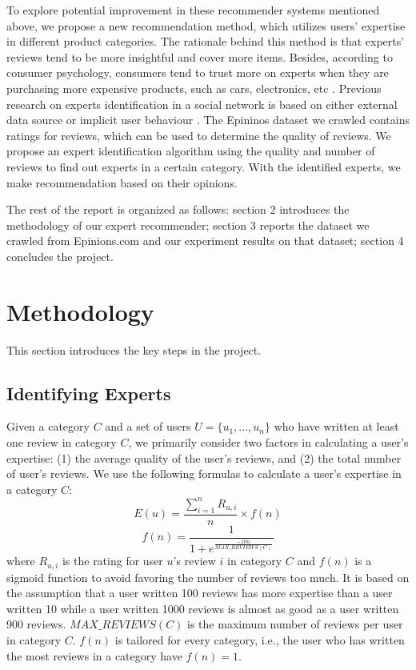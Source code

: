 \documentclass[12pt]{article}
\begin{document}
To explore potential improvement in these recommender systems mentioned above, we propose a new recommendation method, which utilizes users' expertise in different product categories. The rationale behind this method is that experts' reviews tend to be more insightful and cover more items. Besides, according to consumer psychology, consumers tend to trust more on experts when they are purchasing more expensive products, such as cars, electronics, etc \cite{consumer}. Previous research on experts identification in a social network is based on either external data source \cite{Amatriain:2009p101} or implicit user behaviour \cite{Cho:2007p102}. The Epininos dataset we crawled contains ratings for reviews, which can be used to determine the quality of reviews. We propose an expert identification algorithm using the quality and number of reviews to find out experts in a certain category. With the identified experts, we make recommendation based on their opinions.

The rest of the report is organized as follows: section 2 introduces the methodology of our expert recommender; section 3 reports the dataset we crawled from Epinions.com and our experiment results on that dataset; section 4 concludes the project. 

\section{Methodology}
This section introduces the key steps in the project. 

\subsection{Identifying Experts} %
\label{sub:identifying_experts}

Given a category $C$ and a set of users $U = \{{u_{1}, ..., u_{n}}\}$ who have written at least one review in category $C$, we primarily consider two factors in calculating a user's expertise: (1) the average quality of the user's reviews, and (2) the total number of user's reviews. We use the following formulas to calculate a user's expertise in a category $C$:
\begin{equation}
E(u) = \frac{\sum_{i=1}^n R_{u, i}} {n} \times f(n)
\end{equation}
\begin{equation}
f(n) = \frac{1}{1 + e^{\frac{-10n} {MAX\_REVIEWS(C)}}}
\end{equation}
where $R_{u, i}$ is the rating for user $u$'s review $i$ in category $C$ and $f(n)$ is a sigmoid function to avoid favoring the number of reviews too much. It is based on the assumption that a user written 100 reviews has more expertise than a user written 10 while a user written 1000 reviews is almost as good as a user written 900 reviews. $MAX\_REVIEWS(C)$ is the maximum number of reviews per user in category $C$. $f(n)$ is tailored for every category, i.e., the user who has written the most reviews in a category have $f(n)=1$.
\end{document}
